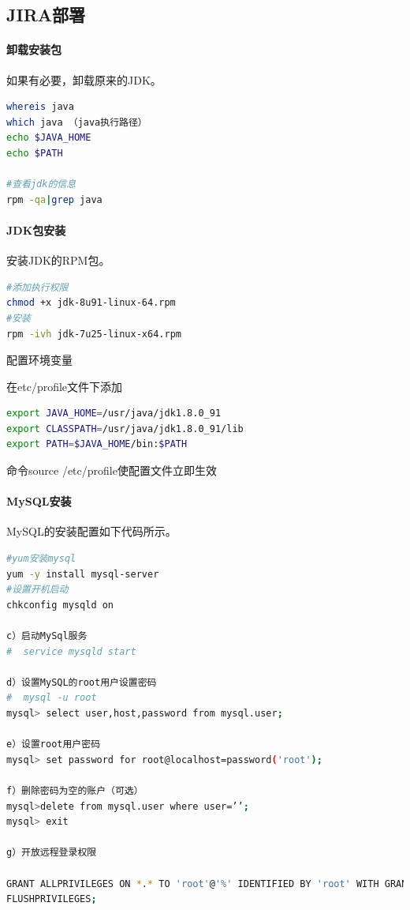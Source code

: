 \documentclass{book}
\begin{document}
\subsection{JIRA部署}

\paragraph{卸载安装包}如果有必要，卸载原来的JDK。

\begin{lstlisting}[language=Bash]
whereis java
which java （java执行路径）
echo $JAVA_HOME
echo $PATH

#查看jdk的信息
rpm -qa|grep java
\end{lstlisting}

\paragraph{JDK包安装}安装JDK的RPM包。

\begin{lstlisting}[language=Bash]
#添加执行权限
chmod +x jdk-8u91-linux-64.rpm
#安装
rpm -ivh jdk-7u25-linux-x64.rpm
\end{lstlisting}

配置环境变量

在etc/profile文件下添加

\begin{lstlisting}[language=Bash]
export JAVA_HOME=/usr/java/jdk1.8.0_91
export CLASSPATH=/usr/java/jdk1.8.0_91/lib
export PATH=$JAVA_HOME/bin:$PATH
\end{lstlisting}

命令source /etc/profile使配置文件立即生效

\paragraph{MySQL安装}MySQL的安装配置如下代码所示。

\begin{lstlisting}[language=Bash]
#yum安装mysql
yum -y install mysql-server
#设置开机启动
chkconfig mysqld on

c）启动MySql服务
#  service mysqld start

d）设置MySQL的root用户设置密码
#  mysql -u root
mysql> select user,host,password from mysql.user;

e）设置root用户密码
mysql> set password for root@localhost=password('root');

f）删除密码为空的账户（可选）
mysql>delete from mysql.user where user=’’;
mysql> exit

g）开放远程登录权限

GRANT ALLPRIVILEGES ON *.* TO 'root'@'%' IDENTIFIED BY 'root' WITH GRANT OPTION;
FLUSHPRIVILEGES;
\end{lstlisting}
\end{document}
